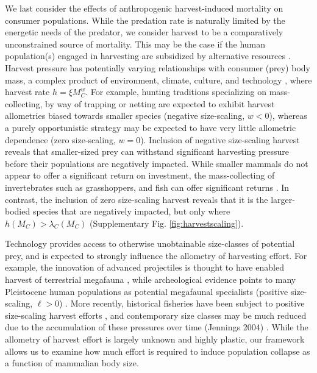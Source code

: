 \documentclass[]{rsos}%
\begin{document}
We last consider the effects of anthropogenic harvest-induced mortality on consumer populations.
While the predation rate is naturally limited by the energetic needs of the predator, we consider harvest to be a comparatively unconstrained source of mortality.
This may be the case if the human population(s) engaged in harvesting are subsidized by alternative resources \cite{Brook2005}.
Harvest pressure has potentially varying relationships with consumer (prey) body mass, a complex product of environment, climate, culture, and technology \cite{churchill1993weapon}, where harvest rate $h = \xi M_C^w$.
For example, hunting traditions specializing on mass-collecting, by way of trapping or netting \cite{churchill1993weapon,ugan2005does} are expected to exhibit harvest allometries biased towards smaller species (negative size-scaling, $w<0$), whereas a purely opportunistic strategy may be expected to have very little allometric dependence (zero size-scaling, $w=0$).
Inclusion of negative size-scaling harvest reveals that smaller-sized prey can withstand significant harvesting pressure before their populations are negatively impacted.
While smaller mammals do not appear to offer a significant return on investment, the mass-collecting of invertebrates such as grasshoppers, and fish can offer significant returns \cite{ugan2005does}.
In contrast, the inclusion of zero size-scaling harvest reveals that it is the larger-bodied species that are negatively impacted, but only where $h(M_C) > \lambda_C(M_C)$ (Supplementary Fig. \ref{fig:harvestscaling}).


Technology provides access to otherwise unobtainable size-classes of potential prey, and is expected to strongly influence the allometry of harvesting effort.
For example, the innovation of advanced projectiles is thought to have enabled harvest of terrestrial megafauna \cite{churchill1993weapon,prates2022changes}, while archeological evidence points to many Pleistocene human populations as potential megafaunal specialists (positive size-scaling, $\ell > 0$) \cite{Smith:2018gm}.
More recently, historical fisheries have been subject to positive size-scaling harvest efforts \cite{Sethi2010}, and contemporary size classes may be much reduced due to the accumulation of these pressures over time (Jennings 2004) \cite{jennings2004fish}.
While the allometry of harvest effort is largely unknown and highly plastic, our framework allows us to examine how much effort is required to induce population collapse as a function of mammalian body size. %
\end{document}

